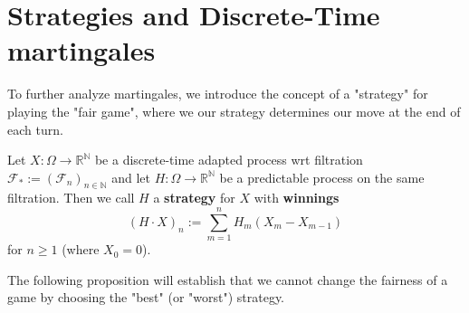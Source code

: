 
\section{Strategies and Discrete-Time martingales}

To further analyze martingales, we introduce the concept of a "strategy" for playing the "fair game", where we our strategy determines our move at the end of each turn.

\begin{definition}
    \label{strategy}
    Let $X: \Omega \to \mathbb{R}^{\mathbb{N}}$ be a discrete-time adapted process wrt filtration $\mathcal{F}_{*} := (\mathcal{F}_{n})_{n \in \mathbb{N}}$ and let $H: \Omega \to \mathbb{R}^{\mathbb{N}}$ be a predictable process on the same filtration. Then we call \(H\) a \textbf{strategy} for \(X\) with \textbf{winnings} 
    \[(H \cdot X)_{n} := \sum\limits_{m=1}^{n} H_{m} (X_{m} - X_{m-1})\]
    for $n \geq 1$ (where \(X_{0} = 0\)).
\end{definition}

The following proposition will establish that we cannot change the fairness of a game by choosing the "best" (or "worst") strategy.

